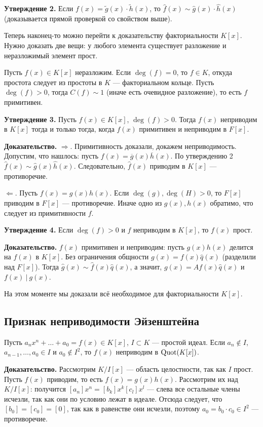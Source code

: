 \textbf{Утверждение 2.} Если $f(x) = \widetilde g(x) \cdot \widetilde h(x)$, то $\widehat f(x) \sim \widehat g(x) \cdot \widehat h(x)$ (доказывается прямой проверкой со свойством выше).

Теперь наконец-то можно перейти к доказательству факториальности $K[x]$.
Нужно доказать две вещи: у любого элемента существует разложение и неразложимый элемент прост.

Пусть $f(x) \in K[x]$ неразложим.
Если $\deg(f) = 0$, то $f \in K$, откуда простота следует из простоты в $K$ --- факториальном кольце.
Пусть $\deg(f) > 0$, тогда $C(f) \sim 1$ (иначе есть очевидное разложение), то есть $f$ примитивен.

\textbf{Утверждение 3.} Пусть $f(x) \in K[x]$, $\deg(f) > 0$. Тогда $f(x)$ неприводим в $K[x]$ тогда и только тогда, когда $f(x)$ примитивен и неприводим в $F[x]$.

\textbf{Доказательство.} $\Rightarrow$. Примитивность доказали, докажем неприводимость.
Допустим, что нашлось: пусть $f(x) = \overline g(x) \overline h(x)$. По утверждению 2 $\widehat f(x) \sim \widehat g(x) \widehat h(x)$.
Следовательно, $\widehat f(x)$ приводим в $K[x]$ --- противоречие.

$\Leftarrow$. Пусть $f(x) = g(x) h(x)$.
Если $\deg(g), \deg(H) > 0$, то $F[x]$ приводим в $F[x]$ --- противоречие.
Иначе одно из $g(x), h(x)$ обратимо, что следует из примитивности $f$.

\QED

\textbf{Утверждение 4.} Если $\deg(f) > 0$ и $f$ неприводим в $K[x]$, то $f(x)$ прост.

\textbf{Доказательство.} $f(x)$ примитивен и неприводим: пусть $g(x) h(x)$ делится на $f(x)$ в $K[x]$.
Без ограничения общности $g(x) = f(x) \widehat q(x)$ (разделили над $F[x]$).
Тогда $\widehat g(x) \sim \widehat f(x) \widehat q(x)$, а значит, $g(x) = A f(x) \widehat q(x)$ и $f(x)~|~g(x)$.

\QED

На этом моменте мы доказали всё необходимое для факториальности $K[x]$.

\subsection{Признак неприводимости Эйзенштейна}
Пусть $a_n x^n + \dots + a_0 = f(x) \in K[x]$, $I \subset K$ --- простой идеал.
Если $a_n \not\in I$, $a_{n-1}, \dots, a_0 \in I$ и $a_0 \not\in I^2$, то $f(x)$ неприводим в $\operatorname{Quot}(K[x])$.

\textbf{Доказательство.} Рассмотрим $K/I[x]$ --- область целостности, так как $I$ прост.
Пусть $f(x)$ приводим, то есть $f(x) = g(x) h(x)$.
Рассмотрим их над $K/I[x]$: получится $[a_n] x^n = [b_k] x^k [c_l] x^l$ --- слева все остальные члены исчезли, так как они по условию лежат в идеале.
Отсюда следует, что $[b_0] = [c_0] = [0]$, так как в равенстве они исчезли, поэтому $a_0 = b_0 \cdot c_0 \in I^2$ --- противоречие.

